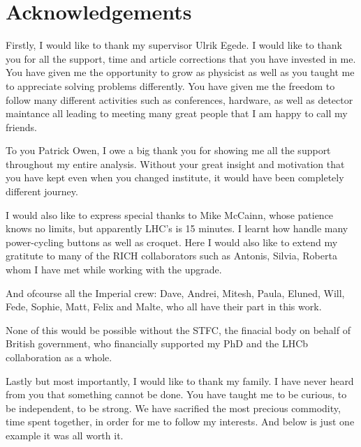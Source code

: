 \chapter*{Acknowledgements}

Firstly, I would like to thank my supervisor Ulrik Egede. I would like to thank you for all the support, time and article corrections that you have invested in me. You have given me the opportunity to grow as physicist as well as you taught me to appreciate solving problems differently. You have given me the freedom to follow many different activities such as conferences, hardware, as well as detector maintance all leading to meeting many great people that I am happy to call my friends.

To you Patrick Owen, I owe a big thank you for showing me all the support throughout my entire analysis. Without your great insight and motivation that you have kept even when you changed institute, it would have been completely different journey. 

I would also like to express special thanks to Mike McCainn, whose patience knows no limits, but apparently LHC's is 15 minutes. I learnt how handle many power-cycling buttons as well as croquet. Here I would also like to extend my gratitute to many of the RICH collaborators such as Antonis, Silvia, Roberta whom I have met while working with the upgrade.

And ofcourse all the Imperial crew: Dave, Andrei, Mitesh, Paula, Eluned, Will, Fede, Sophie, Matt, Felix and Malte, who all have their part in this work.

None of this would be possible without the STFC, the finacial body on behalf of British government, who financially supported my PhD and the LHCb collaboration as a whole.

Lastly but most importantly, I would like to thank my family. I have never heard from you that something cannot be done. You have taught me to be curious, to be independent, to be strong. We have sacrified the most precious commodity, time spent together, in order for me to follow my interests. And below is just one example it was all worth it.  


